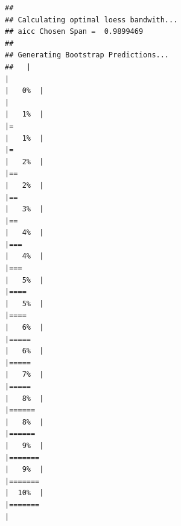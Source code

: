 \documentclass[
  ignorenonframetext,
]{beamer}
\begin{document}
\begin{frame}[fragile]{}
\protect\hypertarget{section-3}{}
\tiny

\begin{verbatim}
## 
## Calculating optimal loess bandwith...
## aicc Chosen Span =  0.9899469 
##  
## Generating Bootstrap Predictions... 
##   |                                                                              |                                                                      |   0%  |                                                                              |                                                                      |   1%  |                                                                              |=                                                                     |   1%  |                                                                              |=                                                                     |   2%  |                                                                              |==                                                                    |   2%  |                                                                              |==                                                                    |   3%  |                                                                              |==                                                                    |   4%  |                                                                              |===                                                                   |   4%  |                                                                              |===                                                                   |   5%  |                                                                              |====                                                                  |   5%  |                                                                              |====                                                                  |   6%  |                                                                              |=====                                                                 |   6%  |                                                                              |=====                                                                 |   7%  |                                                                              |=====                                                                 |   8%  |                                                                              |======                                                                |   8%  |                                                                              |======                                                                |   9%  |                                                                              |=======                                                               |   9%  |                                                                              |=======                                                               |  10%  |                                                                              |=======                                                               | 
\end{verbatim}
\end{frame}
\end{document}

